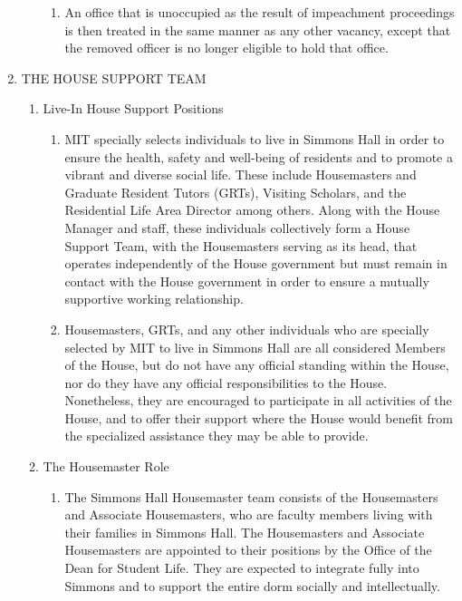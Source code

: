 \documentclass[letterpaper]{article}
\begin{document}
\begin{enumerate}
\begin{enumerate}
\begin{enumerate}
\item An office that is unoccupied as the result of impeachment proceedings is then treated in the same manner as any other vacancy, except that the removed officer is no longer eligible to hold that office.
 
\end{enumerate}

\end{enumerate}

\item THE HOUSE SUPPORT TEAM 

\begin{enumerate}

\item Live-In House Support Positions 

\begin{enumerate}

\item MIT specially selects individuals to live in Simmons Hall in order to ensure the health, safety and well-being of residents and to promote a vibrant and diverse social life. These include Housemasters and Graduate Resident Tutors (GRTs), Visiting Scholars, and the Residential Life Area Director among others. Along with the House Manager and staff, these individuals collectively form a House Support Team, with the Housemasters serving as its head, that operates independently of
the House government but must remain in contact with the House government in order to ensure a mutually supportive working relationship.

\item Housemasters, GRTs, and any other individuals who are specially selected by MIT to live in Simmons Hall are all considered Members of the House, but do not have any official standing within the House, nor do they have any official responsibilities to the House. Nonetheless, they are encouraged to participate in all activities of the House, and to offer their support where the House would benefit from the specialized assistance they may be able to provide.

\end{enumerate}

\item The Housemaster Role 

\begin{enumerate}

\item The Simmons Hall Housemaster team consists of the Housemasters and Associate Housemasters, who are faculty members living with their families in Simmons Hall. The Housemasters and Associate Housemasters are appointed to their positions by the Office of the Dean for Student Life. They are expected to integrate fully into Simmons and to support the entire dorm socially and intellectually.


\end{enumerate}
\end{enumerate}
\end{enumerate}
\end{document}

